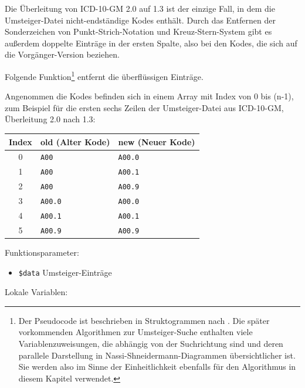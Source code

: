 \newpage


Die Überleitung von ICD-10-GM 2.0 auf 1.3 ist der einzige Fall, in dem die Umsteiger-Datei nicht-endständige Kodes enthält. Durch das Entfernen der Sonderzeichen von Punkt-Strich-Notation und Kreuz-Stern-System gibt es außerdem doppelte Einträge in der ersten Spalte, also bei den Kodes, die sich auf die Vorgänger-Version beziehen.

Folgende Funktion\footnote{Der Pseudocode ist beschrieben in Struktogrammen nach \cite{nassishneid}. Die später vorkommenden Algorithmen zur Umsteiger-Suche enthalten viele Variablenzuweisungen, die abhängig von der Suchrichtung sind und deren parallele Darstellung in Nassi-Shneidermann-Diagrammen übersichtlicher ist. Sie werden also im Sinne der Einheitlichkeit ebenfalls für den Algorithmus in diesem Kapitel verwendet.}
entfernt die überflüssigen Einträge.

Angenommen die Kodes befinden sich in einem Array mit Index von 0 bis (n-1), zum Beispiel für die ersten sechs Zeilen der Umsteiger-Datei aus ICD-10-GM, Überleitung 2.0 nach 1.3: 

\begingroup
\renewcommand{\arraystretch}{1.2}
\setlength{\tabcolsep}{12pt}
\begin{tabular}{cll}
Index & old (Alter Kode) & new (Neuer Kode) \\
\hline
0 & \texttt{A00} & \texttt{A00.0}  \\
1 & \texttt{A00} & \texttt{A00.1} \\
2 & \texttt{A00} & \texttt{A00.9} \\
3 & \texttt{A00.0} & \texttt{A00.0} \\
4 & \texttt{A00.1} & \texttt{A00.1} \\
5 & \texttt{A00.9} & \texttt{A00.9} \\
\end{tabular}
\endgroup


Funktionsparameter:

\begin{itemize}
\item \texttt{\$data} \newline Umsteiger-Einträge
\end{itemize}

Lokale Variablen:

